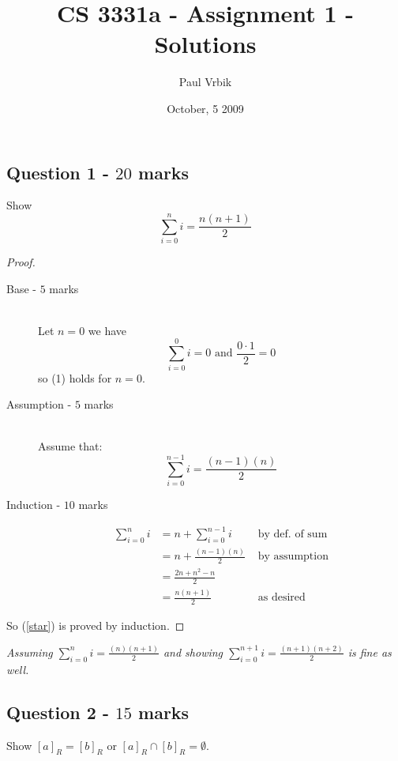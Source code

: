 \documentclass[12pt]{article}
\title{CS 3331a - Assignment 1 - Solutions}
\author{Paul Vrbik}
\date{October, 5 2009}
\begin{document}
\maketitle
\subsection*{Question 1 - $20$ marks}

Show 
\begin{equation}
\sum_{i=0}^n i = \frac { n(n+1) } {2} \label{star}
\end{equation}

\begin{proof} \blank \\
\begin{description}
\item[Base - $5$ marks] \blank\\
Let $n=0$  we have 
$$
\sum_{i=0}^0 i=0  \text{ and } \frac{0 \cdot 1}{2}=0 
$$
so (1) holds for $n=0$.
\item[Assumption - $5$ marks]\blank \\
Assume that:
$$
\sum_{i=0}^{n-1} i = \frac { (n-1)(n) } {2}
$$
\item[Induction - $10$ marks]
\begin{align*}
\sum_{i=0}^n i &=n + \sum_{i=0}^{n-1} i  & \text{ by def. of sum}\\
&=n + \frac{(n-1)(n)}{2} & \text{ by assumption} \\
&=\frac{2n + n^2 -n}{2} &\\
&= \frac{n(n+1)}{2} & \text{ as desired}
\end{align*}
\end{description}
So (\ref{star}) is proved by induction.
\end{proof}
\emph{Assuming $\sum_{i=0}^{n} i = \frac { (n)(n+1) } {2}$ and showing  $\sum_{i=0}^{n+1} i = \frac { (n+1)(n+2) } {2}$ is fine as well.}

\clearpage
\subsection*{Question 2 - $15$ marks}
Show $[a]_R = [b]_R$ or $[a]_R \cap [b]_R = \emptyset$.
\end{document}
